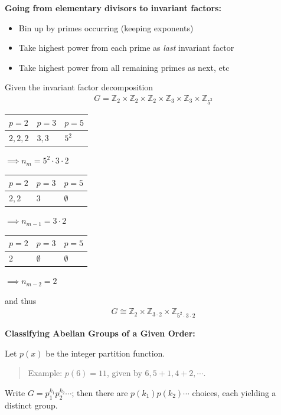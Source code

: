\textbf{Going from elementary divisors to invariant factors:}

\begin{itemize}
\tightlist
\item
  Bin up by primes occurring (keeping exponents)
\item
  Take highest power from each prime as \emph{last} invariant factor
\item
  Take highest power from all remaining primes as next, etc
\end{itemize}

Given the invariant factor decomposition
\begin{align*}
G = {{\mathbb{Z}}_{2}\times{\mathbb{Z}}_{2}\times{\mathbb{Z}}_{2}\times{\mathbb{Z}}_{3}\times{\mathbb{Z}}_{3}\times{\mathbb{Z}}_{5^2}}
\end{align*}

\begin{longtable}[]{@{}lll@{}}
\toprule
\(p = 2\) & \(p= 3\) & \(p =5\)\tabularnewline
\midrule
\endhead
\(2,2,2\) & \(3,3\) & \(5^2\)\tabularnewline
\bottomrule
\end{longtable}

\(\implies n_m = 5^2 \cdot 3 \cdot 2\)

\begin{longtable}[]{@{}lll@{}}
\toprule
\(p = 2\) & \(p= 3\) & \(p =5\)\tabularnewline
\midrule
\endhead
\(2,2\) & \(3\) & \(\emptyset\)\tabularnewline
\bottomrule
\end{longtable}

\(\implies n_{m-1} = 3 \cdot 2\)

\begin{longtable}[]{@{}lll@{}}
\toprule
\(p = 2\) & \(p= 3\) & \(p =5\)\tabularnewline
\midrule
\endhead
\(2\) & \(\emptyset\) & \(\emptyset\)\tabularnewline
\bottomrule
\end{longtable}

\(\implies n_{m-2} = 2\)

and thus
\begin{align*}
G\cong {\mathbb{Z}}_2 \times {\mathbb{Z}}_{3\cdot 2} \times {\mathbb{Z}}_{5^2 \cdot 3 \cdot 2}
\end{align*}

\textbf{Classifying Abelian Groups of a Given Order:}

Let \(p(x)\) be the integer partition function.

\begin{quote}
Example: \(p(6) = 11\), given by \(6, 5+1, 4+2, \cdots\).
\end{quote}

Write \(G = p_1^{k_1} p_2^{k_2} \cdots\); then there are
\(p(k_1) p(k_2) \cdots\) choices, each yielding a distinct group.





